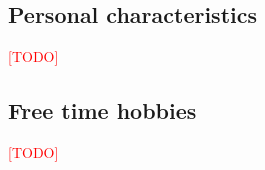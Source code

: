 \documentclass{article}
\begin{document}
\subsection*{Personal characteristics} \textcolor{red}{[TODO]}


\subsection*{Free time hobbies} \textcolor{red}{[TODO]}

\end{document}

